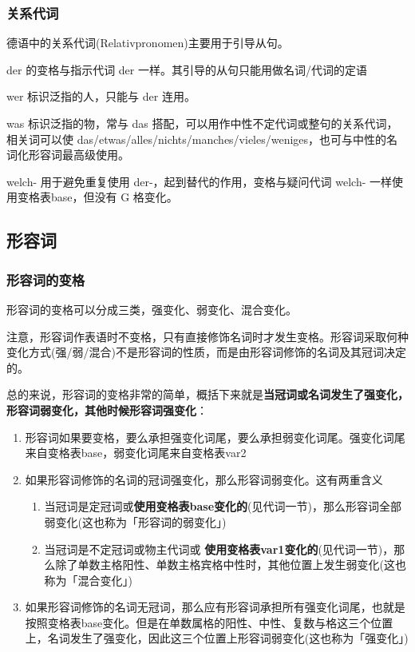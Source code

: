 \subsubsection{关系代词}\label{sec:relativnoun}

德语中的关系代词(Relativpronomen)主要用于引导从句。

der 的变格与指示代词 der 一样。其引导的从句只能用做名词/代词的定语

wer 标识泛指的人，只能与 der 连用。

was 标识泛指的物，常与 das 搭配，可以用作中性不定代词或整句的关系代词，相关词可以使 das/etwas/alles/nichts/manches/vieles/weniges，也可与中性的名词化形容词最高级使用。

welch- 用于避免重复使用 der-，起到替代的作用，变格与疑问代词 welch- 一样使用变格表base，但没有 G 格变化。

\subsection{形容词}

\subsubsection{形容词的变格}

形容词的变格可以分成三类，强变化、弱变化、混合变化。

注意，形容词作表语时不变格，只有直接修饰名词时才发生变格。形容词采取何种变化方式(强/弱/混合)不是形容词的性质，而是由形容词修饰的名词及其冠词决定的。

总的来说，形容词的变格非常的简单，概括下来就是{\bf 当冠词或名词发生了强变化，形容词弱变化，其他时候形容词强变化}：

\begin{enumerate}[leftmargin=3.5em, topsep=0pt, itemsep=0pt, parsep=0pt]
    \item 形容词如果要变格，要么承担强变化词尾，要么承担弱变化词尾。强变化词尾来自变格表base，弱变化词尾来自变格表var2
    \item 如果形容词修饰的名词的冠词强变化，那么形容词弱变化。这有两重含义
    \begin{enumerate}
        \item 当冠词是定冠词或{\bf 使用变格表base变化的}(见代词一节)，那么形容词全部弱变化(这也称为「形容词的弱变化」)
        \item 当冠词是不定冠词或物主代词或 {\bf 使用变格表var1变化的}(见代词一节)，那么除了单数主格阳性、单数主格宾格中性时，其他位置上发生弱变化(这也称为「混合变化」)
    \end{enumerate}
    \item 如果形容词修饰的名词无冠词，那么应有形容词承担所有强变化词尾，也就是按照变格表base变化。但是在单数属格的阳性、中性、复数与格这三个位置上，名词发生了强变化，因此这三个位置上形容词弱变化(这也称为「强变化」)
\end{enumerate}

